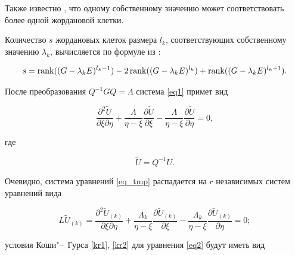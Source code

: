 Также известно \cite{gant}, что одному собственному значению  может соответствовать более одной жордановой клетки. 

Количество $s$ жордановых клеток размера $l_k$, соответствующих собственному значению $\lambda_k$, вычисляется по формуле из \cite{tir}:

\begin{equation*}

\label{count_j}

 s=\mathop{\rm rank}((G-\lambda_k E)^{l_k-1})-2 \mathop{\rm rank}((G-\lambda_k E)^{l_k}) + \mathop{\rm rank}((G-\lambda_k E)^{l_k+1}).

\end{equation*}



После преобразования  $Q^{-1} G Q=\Lambda$ система \eqref{eq1} примет вид

\begin{equation}

  \label{eq_tmp}

  \frac{\partial^{2}\tilde{U}}{\partial \xi \partial \eta}+\frac{\Lambda}{\eta - \xi}\frac{\partial \tilde{U}}{\partial \xi}-\frac{\Lambda}{\eta - \xi}\frac{\partial \tilde{U}}{\partial \eta}=0,

\end{equation}

где 

\begin{equation}

\label{QU}

\tilde{U}=Q^{-1} U .

\end{equation}



Очевидно, система уравнений \eqref{eq_tmp} распадается на $r$ независимых систем уравнений вида

\begin{equation}

  \label{eq2}

  L\tilde{U}_{(k)}=\frac{\partial^{2} \tilde{U}_{(k)}}{\partial \xi \partial \eta}+\frac{\Lambda_k}{\eta - \xi}\frac{\partial \tilde{U}_{(k)}}{\partial \xi}-\frac{\Lambda_k}{\eta - \xi}\frac{\partial \tilde{U}_{(k)}}{\partial \eta}=0;

\end{equation}

условия Коши"--~Гурса \eqref{kr1}, \eqref{kr2} для уравнения \eqref{eq2} будут иметь вид

